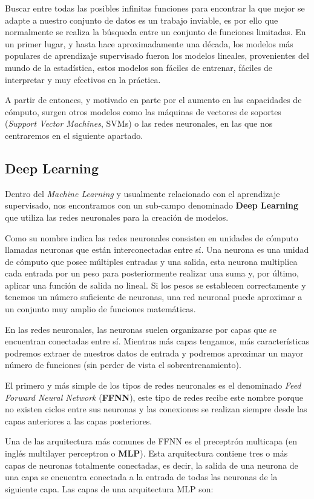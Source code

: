 Buscar entre todas las posibles infinitas funciones para encontrar la que mejor se adapte a nuestro conjunto de datos es un trabajo inviable, es por ello que normalmente se realiza la búsqueda entre un conjunto de funciones limitadas. En un primer lugar, y hasta hace aproximadamente una década, los modelos más populares de aprendizaje supervisado fueron los modelos lineales, provenientes del mundo de la estadística, estos modelos son fáciles de entrenar, fáciles de interpretar y muy efectivos en la práctica. 

A partir de entonces, y motivado en parte por el aumento en las capacidades de cómputo, surgen otros modelos como las máquinas de vectores de soportes (\textit{Support Vector Machines}, SVMs) o las redes neuronales, en las que nos centraremos en el siguiente apartado.


\subsection{Deep Learning}
Dentro del \textit{Machine Learning} y usualmente relacionado con el aprendizaje supervisado, nos encontramos con un sub-campo denominado \textbf{Deep Learning} que utiliza las redes neuronales para la creación de modelos. 

Como su nombre indica las redes neuronales consisten en unidades de cómputo llamadas neuronas que están interconectadas entre sí. Una neurona es una unidad de cómputo que posee múltiples  entradas y una  salida, esta neurona multiplica cada entrada por un peso para posteriormente realizar una suma y, por último, aplicar una función de salida no lineal. Si los pesos se establecen correctamente y tenemos un número suficiente de neuronas, una red neuronal puede aproximar a un conjunto muy amplio de funciones matemáticas. 

En las redes neuronales, las neuronas suelen organizarse por capas que se encuentran conectadas entre sí. Mientras más capas tengamos, más características podremos extraer de nuestros datos de entrada y podremos aproximar un mayor número de funciones (sin perder de vista el sobrentrenamiento). 


El primero y más simple de los tipos de redes neuronales es el denominado \textit{Feed Forward Neural Network} (\textbf{FFNN}), este tipo de redes recibe este nombre porque no existen ciclos entre sus neuronas y las conexiones se realizan siempre desde las capas anteriores a las capas posteriores. 


Una de las arquitectura más comunes de FFNN es el preceptrón multicapa (en inglés multilayer perceptron o \textbf{MLP}). Esta arquitectura contiene tres o más capas de neuronas totalmente conectadas, es decir, la salida de una neurona de una capa se encuentra conectada a la entrada de todas las neuronas de la siguiente capa. Las capas de una arquitectura MLP son:

